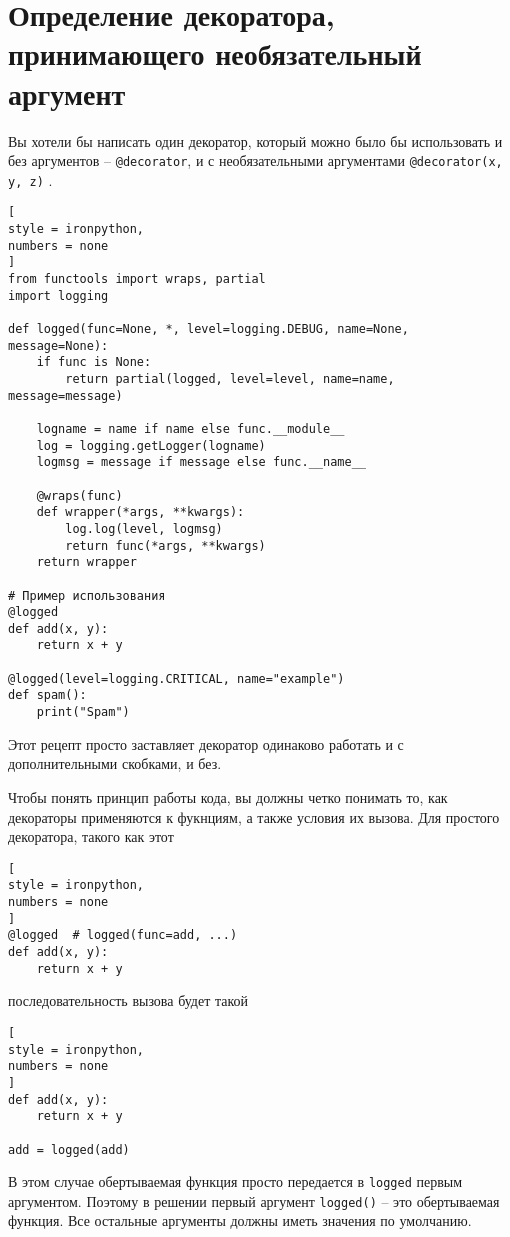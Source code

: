 \documentclass[%
	11pt,
	a4paper,
	utf8,
		]{article}
\begin{document}
\section{Определение декоратора, принимающего необязательный аргумент}

Вы хотели бы написать один декоратор, который можно было бы использовать и без аргументов -- \verb|@decorator|, и с необязательными аргументами \verb|@decorator(x, y, z)| \cite[]{beazley:python_cookbook-2019}.

\begin{lstlisting}[
style = ironpython,
numbers = none
]
from functools import wraps, partial
import logging

def logged(func=None, *, level=logging.DEBUG, name=None, message=None):
    if func is None:
        return partial(logged, level=level, name=name, message=message)
        
    logname = name if name else func.__module__
    log = logging.getLogger(logname)
    logmsg = message if message else func.__name__
    
    @wraps(func)
    def wrapper(*args, **kwargs):
        log.log(level, logmsg)
        return func(*args, **kwargs)
    return wrapper
    
# Пример использования
@logged
def add(x, y):
    return x + y
    
@logged(level=logging.CRITICAL, name="example")
def spam():
    print("Spam")
\end{lstlisting}

Этот рецепт просто заставляет декоратор одинаково работать и с дополнительными скобками, и без.

Чтобы понять принцип работы кода, вы должны четко понимать то, как декораторы применяются к фукнциям, а также условия их вызова. Для простого декоратора, такого как этот
\begin{lstlisting}[
style = ironpython,
numbers = none
]
@logged  # logged(func=add, ...)
def add(x, y):
    return x + y
\end{lstlisting}
последовательность вызова будет такой
\begin{lstlisting}[
style = ironpython,
numbers = none
]
def add(x, y):
    return x + y
    
add = logged(add)
\end{lstlisting}

В этом случае обертываемая функция просто передается в \texttt{logged} первым аргументом. Поэтому в решении первый аргумент \texttt{logged()} -- это обертываемая функция. Все остальные аргументы должны иметь значения по умолчанию.
\end{document}
